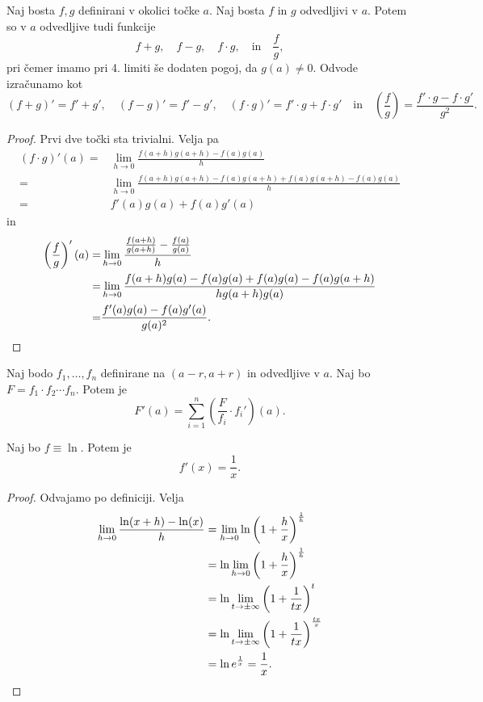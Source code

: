 \documentclass[12pt, a4paper]{article}
\begin{document}
\begin{izrek}
Naj bosta $f,g$ definirani v okolici točke $a$. Naj bosta $f$ in $g$ odvedljivi v $a$. Potem so v $a$ odvedljive tudi funkcije
\[
f+g,\quad f-g,\quad f\cdot g,\quad\text{in}\quad \frac{f}{g},
\]
pri čemer imamo pri 4. limiti še dodaten pogoj, da $g(a)\ne 0$. Odvode izračunamo kot
\[
(f+g)'=f'+g',\quad (f-g)'=f'-g',\quad (f\cdot g)'=f'\cdot g+f\cdot g'\quad\text{in}\quad \left(\frac{f}{g}\right)=\frac{f'\cdot g-f\cdot g'}{g^2}.
\]
\end{izrek}

\begin{proof}
Prvi dve točki sta trivialni. Velja pa
\begin{align*}
(f\cdot g)'(a)=&\lim_{h\to 0}\frac{f(a+h)g(a+h)-f(a)g(a)}{h}
\\
=&\lim_{h\to 0}\frac{f(a+h)g(a+h)-f(a)g(a+h)+f(a)g(a+h)-f(a)g(a)}{h}
\\
=&f'(a)g(a)+f(a)g'(a)
\end{align*}
in
\begin{align*}
\left(\frac{f}{g}\right)'(a)=&\lim_{h\to 0}\frac{\frac{f(a+h)}{g(a+h)}-\frac{f(a)}{g(a)}}{h}
\\
=&\lim_{h\to 0}\frac{f(a+h)g(a)-f(a)g(a)+f(a)g(a)-f(a)g(a+h)}{hg(a+h)g(a)}
\\
=&\frac{f'(a)g(a)-f(a)g'(a)}{g(a)^2}.\qedhere
\end{align*}
\end{proof}

\begin{posledica}
Naj bodo $f_1,\dots,f_n$ definirane na $(a-r,a+r)$ in odvedljive v $a$. Naj bo $F=f_1\cdot f_2\cdots f_n$. Potem je
\[
F'(a)=\sum_{i=1}^n\left(\frac{F}{f_i}\cdot f_i'\right)(a).
\]
\end{posledica}

\begin{posledica}
Naj bo $f\equiv\ln$. Potem je
\[
f'(x)=\frac{1}{x}.
\]
\end{posledica}

\begin{proof}
Odvajamo po definiciji. Velja
\begin{align*}
\lim_{h\to 0}\frac{\ln(x+h)-\ln(x)}{h}
&=\lim_{h\to 0}\ln\left(1+\frac{h}{x}\right)^{\frac{1}{h}}
\\
&=\ln\lim_{h\to 0}\left(1+\frac{h}{x}\right)^{\frac{1}{h}}
\\
&=\ln\lim_{t\to\pm\infty}\left(1+\frac{1}{tx}\right)^t
\\
&=\ln\lim_{t\to\pm\infty}\left(1+\frac{1}{tx}\right)^{\frac{tx}{x}}
\\
&=\ln e^{\frac{1}{x}}=\frac{1}{x}.\qedhere
\end{align*}
\end{proof}
\end{document}
